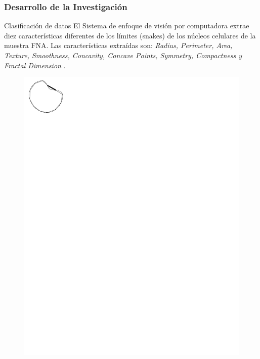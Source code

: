 \documentclass[xcolor=dvipsnames,xcolor=table]{beamer} %
\begin{document}
\begin{frame}
	\frametitle{Desarrollo de la Investigación}
	\begin{block}{Clasificación de datos}\justifying
		El Sistema de enfoque de visión por computadora extrae diez características diferentes de los límites (snakes) de los núcleos celulares de la muestra FNA.  Las características extraídas son:
		\textit{Radius, Perimeter, Area, Texture, Smoothness, Concavity, Concave Points, Symmetry, Compactness y Fractal Dimension} \cite{b3}.
	\end{block}
	\begin{figure}[!htb]
		\includegraphics[width=1\linewidth]{PROYECTO/imgs/FnaClassification/Concavity}
		\endminipage\hfill

\end{figure}
\end{frame}
\end{document}
